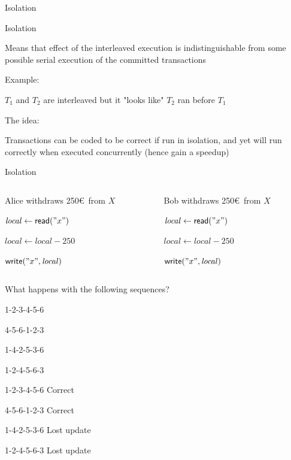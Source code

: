 \begin{frame}{Isolation}

\BI
\item Isolation
  \BI
  \item Means that effect of the interleaved execution is indistinguishable from some possible serial execution of the committed transactions 
  \EI
\item Example:
  \BI
  \item $T_1$ and $T_2$ are interleaved but it "looks like" $T_2$ ran before $T_1$
  \EI
\item The idea:
  \BI
  \item Transactions can be coded to be correct if run in isolation, and yet will run correctly when executed concurrently (hence gain a speedup)
  \EI
\EI

\end{frame}

\begin{frame}{Isolation}
	
\begin{columns}[T]
\begin{column}{0.5\textwidth}
\BI
\item Alice withdraws 250\euro\ from $X$ 
  \BI
  \item[1)] $\mathit{local} \gets \textsf{{read}}("x")$
  \item[2)] $\mathit{local} \gets \mathit{local} - 250$
  \item[3)] $\textsf{{write}}("x",\mathit{local})$
  \EI
\EI
\end{column}
\begin{column}{0.5\textwidth}
\BI
\item Bob withdraws 250\euro\ from $X$
  \BI
  \item[4)] $\mathit{local} \gets \textsf{{read}}("x")$
  \item[5)] $\mathit{local} \gets \mathit{local} - 250$
  \item[6)] $\textsf{{write}}("x",\mathit{local})$
  \EI
\EI

\end{column}
\end{columns}

\bigskip
\alert{What happens with the following sequences?}
\begin{overprint}
\BI
\item 1-2-3-4-5-6
\item 4-5-6-1-2-3
\item 1-4-2-5-3-6
\item 1-2-4-5-6-3
\EI
{}
\BI
\item 1-2-3-4-5-6 \qquad Correct
\item 4-5-6-1-2-3 \qquad Correct
\item 1-4-2-5-3-6 \qquad Lost update
\item 1-2-4-5-6-3 \qquad Lost update
\EI
\end{overprint}
\end{frame}


